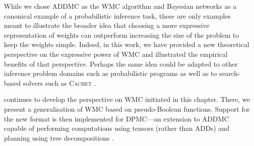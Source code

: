 While we chose \textsc{ADDMC} \citep{DBLP:conf/aaai/DudekPV20} as the WMC
algorithm and Bayesian networks as a canonical example of a probabilistic
inference task, these are only examples meant to illustrate the broader idea
that choosing a more expressive representation of weights can outperform
increasing the size of the problem to keep the weights simple. Indeed, in this
work, we have provided a new theoretical perspective on the expressive power of
WMC and illustrated the empirical benefits of that perspective. Perhaps the same
idea could be adapted to other inference problem domains such as probabilistic
programs
\citep{DBLP:journals/tplp/FierensBRSGTJR15,DBLP:journals/corr/abs-2005-09089} as
well as to search-based solvers such as \textsc{Cachet}
\citep{DBLP:conf/sat/SangBBKP04}.

 continues to develop the perspective on WMC initiated in
this chapter. There, we present a generalisation of WMC based on pseudo-Boolean
functions. Support for the new format is then implemented for \textsc{DPMC}---an
extension to \textsc{ADDMC} capable of performing computations using tensors
(rather than ADDs) and planning using tree decompositions
\citep{DBLP:conf/cp/DudekPV20}.
